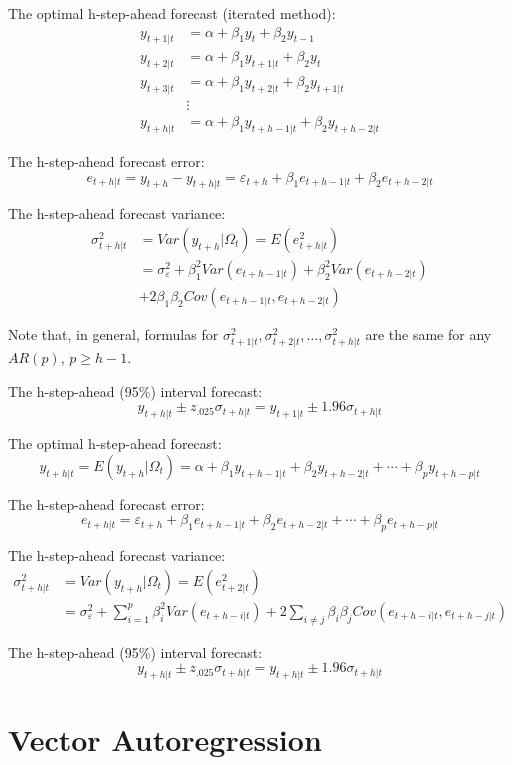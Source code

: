 \documentclass[
  oneside]{book}
\begin{document}
The optimal h-step-ahead forecast (iterated method):
\[\begin{aligned}
y_{t+1|t} &= \alpha + \beta_1 y_t + \beta_2 y_{t-1} \\
y_{t+2|t} &= \alpha + \beta_1 y_{t+1|t} + \beta_2 y_{t} \\
y_{t+3|t} &= \alpha + \beta_1 y_{t+2|t} + \beta_2 y_{t+1|t} \\
&\vdots \\
y_{t+h|t} &= \alpha + \beta_1 y_{t+h-1|t} + \beta_2 y_{t+h-2|t}
\end{aligned}\]

The h-step-ahead forecast error: \[e_{t+h|t} = y_{t+h} - y_{t+h|t} = \varepsilon_{t+h}+\beta_1 e_{t+h-1|t}+\beta_2 e_{t+h-2|t}\]

The h-step-ahead forecast variance:
\[\begin{aligned}
\sigma_{t+h|t}^2 &= Var(y_{t+h}|\Omega_t) = E(e_{t+h|t}^2) \\
&= \sigma_{\varepsilon}^2+\beta_1^2 Var(e_{t+h-1|t})+\beta_2^2 Var(e_{t+h-2|t}) \\
&+2\beta_1\beta_2Cov(e_{t+h-1|t},e_{t+h-2|t})
\end{aligned}\]

Note that, in general, formulas for \(\sigma_{t+1|t}^2,\sigma_{t+2|t}^2,\ldots,\sigma_{t+h|t}^2\) are the same for any \(AR(p)\), \(p \geq h-1\).

The h-step-ahead (95\%) interval forecast: \[y_{t+h|t} \pm z_{.025}\sigma_{t+h|t} = y_{t+1|t} \pm 1.96\sigma_{t+h|t}\]

The optimal h-step-ahead forecast: \[y_{t+h|t} = E(y_{t+h}|\Omega_t) = \alpha + \beta_1 y_{t+h-1|t} + \beta_2 y_{t+h-2|t} + \cdots + \beta_p y_{t+h-p|t}\]

The h-step-ahead forecast error: \[e_{t+h|t} = \varepsilon_{t+h} + \beta_1 e_{t+h-1|t} + \beta_2 e_{t+h-2|t} + \cdots + \beta_p e_{t+h-p|t}\]

The h-step-ahead forecast variance:
\[\begin{aligned}
\sigma_{t+h|t}^2 & = Var(y_{t+h}|\Omega_t) = E(e_{t+2|t}^2) \\
&= \sigma_{\varepsilon}^2 + \sum_{i=1}^{p}\beta_i^2 Var(e_{t+h-i|t}) + 2\sum_{i \neq j}\beta_i\beta_j Cov(e_{t+h-i|t},e_{t+h-j|t})
\end{aligned}\]

The h-step-ahead (95\%) interval forecast: \[y_{t+h|t} \pm z_{.025}\sigma_{t+h|t} = y_{t+h|t} \pm 1.96\sigma_{t+h|t}\]

\hypertarget{vector-autoregression}{%
\chapter{Vector Autoregression}\label{vector-autoregression}}
\end{document}
